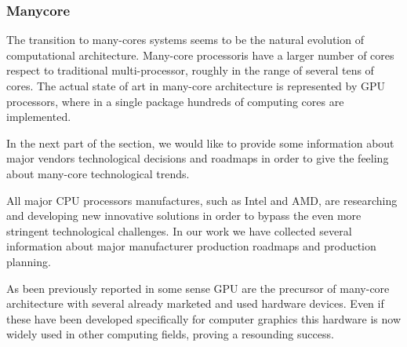 \subsubsection{Manycore}

The transition to many-cores systems seems to be the natural evolution of computational architecture. Many-core processoris have a larger number of cores respect to traditional multi-processor, roughly in the range of several tens of cores. The actual state of art in many-core architecture is represented by GPU processors, where in
a single package hundreds of computing cores are implemented. 



In the next part of the section, we would like to provide some information about major vendors technological decisions and 
roadmaps in order to give the feeling about many-core technological trends.

  
All major CPU processors manufactures, such as Intel and AMD, are researching and developing new innovative solutions in
 order to  bypass the even more stringent technological challenges. In our work we have collected several information 
about major manufacturer production roadmaps and production planning.

As been previously reported in some sense GPU  are the precursor of many-core architecture with several already marketed 
and used hardware devices. Even if these have been developed specifically for computer graphics this hardware is now 
 widely used in other computing fields, proving a resounding success.

